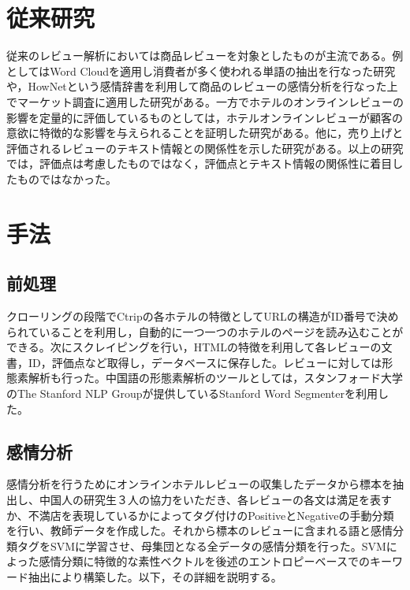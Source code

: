 \documentclass[review]{elsarticle}
\begin{document}
\begin{CJK}{UTF8}{min}
\section{従来研究}\label{lit_rev}

従来のレビュー解析においては商品レビューを対象としたものが主流である。例としてはWord Cloudを適用し消費者が多く使われる単語の抽出を行なった研究\cite[][]{hargreaves2015}や，HowNetという感情辞書を利用して商品のレビューの感情分析を行なった上でマーケット調査に適用した研究\cite[][]{zhang2011feature}がある。一方でホテルのオンラインレビューの影響を定量的に評価しているものとしては，ホテルオンラインレビューが顧客の意欲に特徴的な影響を与えられることを証明した研究がある\cite[][]{VERMEULEN2009123}。他に，売り上げと評価されるレビューのテキスト情報との関係性を示した研究がある\cite[][]{basuroy2003}。以上の研究では，評価点は考慮したものではなく，評価点とテキスト情報の関係性に着目したものではなかった。

\section{手法}\label{methodology}

\subsection{前処理}\label{preprocessing}

クローリングの段階でCtripの各ホテルの特徴としてURLの構造がID番号で決められていることを利用し，自動的に一つ一つのホテルのページを読み込むことができる。次にスクレイピングを行い，HTMLの特徴を利用して各レビューの文書，ID，評価点など取得し，データベースに保存した。レビューに対しては形態素解析も行った。中国語の形態素解析のツールとしては，スタンフォード大学のThe Stanford NLP Groupが提供しているStanford Word Segmenter\cite[][]{chang2008}を利用した。

\subsection{感情分析}\label{sentiment_analysis}

感情分析を行うためにオンラインホテルレビューの収集したデータから標本を抽出し、中国人の研究生３人の協力をいただき、各レビューの各文は満足を表すか、不満店を表現しているかによってタグ付けのPositiveとNegativeの手動分類を行い、教師データを作成した。それから標本のレビューに含まれる語と感情分類タグをSVMに学習させ、母集団となる全データの感情分類を行った。SVMによった感情分類に特徴的な素性ベクトルを後述のエントロピーベースでのキーワード抽出により構築した。以下，その詳細を説明する。


\end{CJK}
\end{document}
